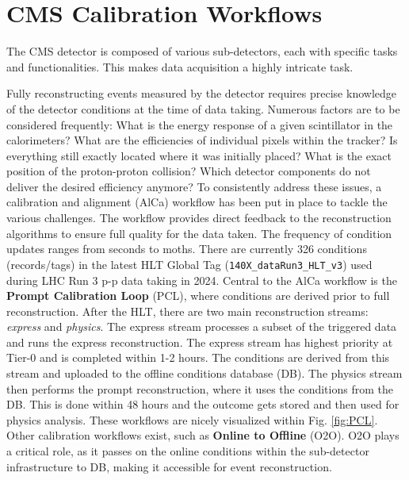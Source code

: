 
\section{CMS Calibration Workflows}
The CMS detector is composed of various sub-detectors, each with specific tasks and functionalities. This makes data acquisition a highly intricate task.

Fully reconstructing events measured by the detector requires precise knowledge of the detector conditions at the time of data taking. Numerous factors are to be considered frequently: What is the energy response of a given scintillator in the calorimeters? What are the efficiencies of individual pixels within the tracker? Is everything still exactly located where it was initially placed? What is the exact position of the proton-proton collision? Which detector components do not deliver the desired efficiency anymore? To consistently address these issues, a calibration and alignment (AlCa) workflow has been put in place to tackle the various challenges. The workflow provides direct feedback to the reconstruction algorithms to ensure full quality for the data taken. The frequency of condition updates ranges from seconds to moths. There are currently 326 conditions (records/tags) in the latest HLT Global Tag (\texttt{140X\_dataRun3\_HLT\_v3}) used during LHC Run 3 p-p data taking in 2024. 
\newline \newline
Central to the AlCa workflow is the \textbf{Prompt Calibration Loop} (PCL), where conditions are derived prior to full reconstruction. After the HLT, there are two main reconstruction streams: \textit{express} and \textit{physics}. The express stream processes a subset of the triggered data and runs the express reconstruction. The express stream has highest priority at Tier-0 and is completed within 1-2 hours. The conditions are derived from this stream and uploaded to the offline conditions database (DB). The physics stream then performs the prompt reconstruction, where it uses the conditions from the DB. This is done within 48 hours and the outcome gets stored and then used for physics analysis. These workflows are nicely visualized within Fig. \ref{fig:PCL}. Other calibration workflows exist, such as \textbf{Online to Offline} (O2O). O2O plays a critical role, as it passes on the online conditions within the sub-detector infrastructure to DB, making it accessible for event reconstruction.



